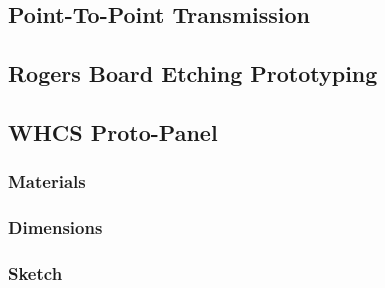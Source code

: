 
\subsection{Point-To-Point Transmission}

\subsection{Rogers Board Etching Prototyping}

\subsection{WHCS Proto-Panel}

\subsubsection{Materials}

\subsubsection{Dimensions}

\subsubsection{Sketch}

